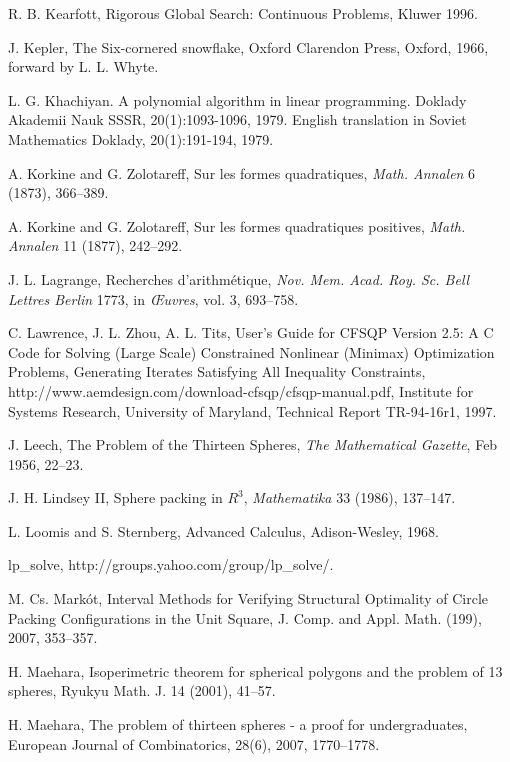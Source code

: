 \begin{thebibliography}{CHMS94}
 R. B. Kearfott, Rigorous Global Search: Continuous
Problems, Kluwer 1996.

 J. Kepler, The Six-cornered snowflake, Oxford Clarendon Press,
    Oxford, 1966,  forward by L. L. Whyte.

 L. G. Khachiyan. A polynomial algorithm in linear programming. Doklady Akademii Nauk SSSR, 20(1):1093-1096, 1979. English translation in Soviet Mathematics Doklady, 20(1):191-194, 1979.

 A. Korkine and  G. Zolotareff, Sur les formes quadratiques,
    {\it Math. Annalen} 6 (1873), 366--389.

 A. Korkine and  G. Zolotareff, Sur les formes quadratiques
    positives, {\it Math. Annalen} 11 (1877), 242--292.

 J. L. Lagrange,  Recherches d'arithm\'etique, {\it Nov. Mem.
    Acad. Roy. Sc. Bell Lettres Berlin} 1773, in {\it \OE uvres}, vol. 3,
    693--758.

 C. Lawrence, J. L. Zhou, A. L. Tits,  User's Guide for CFSQP Version 2.5:
   A C Code for Solving (Large Scale) Constrained Nonlinear (Minimax) Optimization Problems, Generating
   Iterates Satisfying All Inequality Constraints, 
   http://www.aemdesign.com/download-cfsqp/cfsqp-manual.pdf, 
   Institute for Systems Research, University of Maryland, Technical Report TR-94-16r1, 1997.

 J. Leech, The Problem of the Thirteen Spheres,
{\it The Mathematical Gazette}, Feb 1956, 22--23.

 J. H. Lindsey II, Sphere packing in $R^3$, {\it Mathematika}
    33 (1986), 137--147.

 L. Loomis and S. Sternberg, Advanced Calculus, Adison-Wesley, 1968.

 lp\_solve, http://groups.yahoo.com/group/lp\_solve/.

 M. Cs. Mark\'ot, Interval Methods for
Verifying Structural Optimality of Circle Packing Configurations
in the Unit Square,  J. Comp. and Appl. Math. (199),
2007, 353--357.

 H. Maehara, Isoperimetric theorem for spherical
polygons and the problem of 13 spheres, Ryukyu Math. J. 14 (2001), 41--57.

 H. Maehara, The problem of thirteen spheres - a proof for undergraduates, European Journal of Combinatorics, 28(6), 2007,
1770--1778.


\end{thebibliography}

